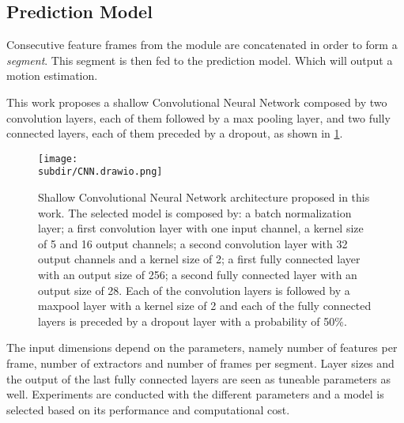 \subsection{Prediction Model} \label{subsec:prediction-model}

Consecutive feature frames from the  module
are concatenated in order to form a \emph{segment}. This segment is then fed to
the prediction model. Which will output a motion estimation.

This work proposes a shallow Convolutional Neural Network \cite{FukushimaCNN}
composed by two convolution layers, each of them followed by a max pooling
layer, and two fully connected layers, each of them preceded by a dropout, as
shown in \cref{fig:model-arch-cnn}. 


\begin{figure}
    \centering
    \texttt{[image: \\subdir/CNN.drawio.png]}
    \caption{Shallow Convolutional Neural Network architecture proposed in this
    work. The selected model is composed by: a batch normalization layer; a
    first convolution layer with one input channel, a kernel size of 5 and 16
    output channels; a second convolution layer with 32 output channels and a
    kernel size of 2; a first fully connected layer with an output size of 256;
    a second fully connected layer with an output size of 28. Each of the
    convolution layers is followed by a maxpool layer with a kernel size of 2
    and each of the fully connected layers is preceded by a dropout layer with
    a probability of 50\%.}
    \label{fig:model-arch-cnn}
\end{figure}

The input dimensions depend on the 
parameters, namely number of features per frame, number of extractors and
number of frames per segment. Layer sizes and the output of the last fully
connected layers are seen as tuneable parameters as well. Experiments are
conducted with the different parameters and a model is selected based on its
performance and computational cost.



